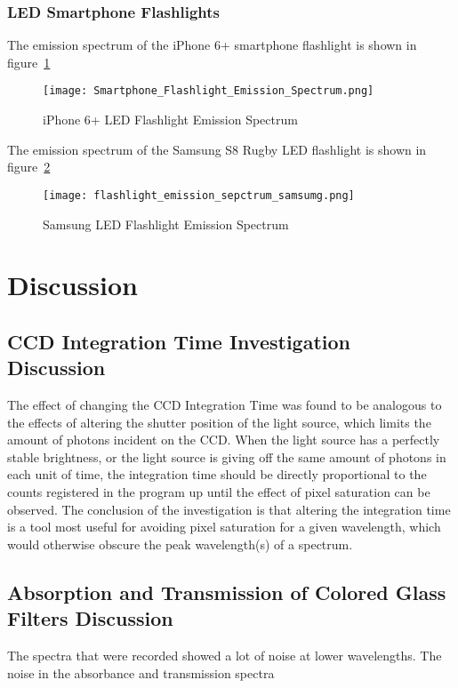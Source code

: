 \documentclass{article}
\begin{document}
\subsubsection{LED Smartphone Flashlights}
The emission spectrum of the iPhone 6+ smartphone flashlight is shown in figure~\ref{fig:iphone LED emission}

\begin{figure}[h!]
    \centering
    \texttt{[image: Smartphone\_Flashlight\_Emission\_Spectrum.png]}
    \caption{iPhone 6+ LED Flashlight Emission Spectrum}
    \label{fig:iphone LED emission}
\end{figure}

The emission spectrum of the Samsung S8 Rugby LED flashlight is shown in figure~\ref{fig:samsung LED emission}

\begin{figure}[h!]
    \centering
    \texttt{[image: flashlight\_emission\_sepctrum\_samsumg.png]}
    \caption{Samsung LED Flashlight Emission Spectrum}
    \label{fig:samsung LED emission}
\end{figure}


\section{Discussion}
\subsection{CCD Integration Time Investigation Discussion}
The effect of changing the CCD Integration Time was found to be analogous to the effects of altering the shutter position of the light source, which limits the amount of photons incident on the CCD. When the light source has a perfectly stable brightness, or the light source is giving off the same amount of photons in each unit of time, the integration time should be directly proportional to the counts registered in the program up until the effect of pixel saturation can be observed. The conclusion of the investigation is that altering the integration time is a tool most useful for avoiding pixel saturation for a given wavelength, which would otherwise obscure the peak wavelength(s) of a spectrum.

\subsection{Absorption and Transmission of Colored Glass Filters Discussion}
The spectra that were recorded showed a lot of noise at lower wavelengths. The noise in the absorbance and transmission spectra 
\end{document}
